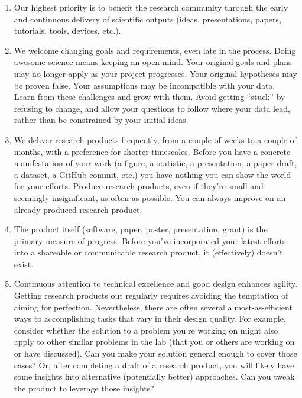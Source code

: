 \documentclass{tufte-book} %
\begin{document}
\begin{enumerate}
\item Our highest priority is to benefit the research community
  through the early and continuous delivery of scientific outputs
  (ideas, presentations, papers, tutorials, tools, devices, etc.).

\item We welcome changing goals and requirements, even late in the process.  Doing
  awesome science means keeping an open mind.  Your original goals and
  plans may no longer apply as your project progresses.  Your original
  hypotheses may be proven false.  Your assumptions may be
  incompatible with your data.  Learn from these challenges and grow
  with them.  Avoid getting ``stuck'' by refusing to change, and allow your questions to follow where your data lead, rather than be constrained by your initial ideas.

\item We deliver research products frequently, from a couple of weeks to
  a couple of months, with a preference for shorter timescales.
  Before you have a concrete manifestation of your work (a figure, a
  statistic, a presentation, a paper draft, a dataset, a GitHub
  commit, etc.) you have nothing you can show the world for your
  efforts.  Produce research products, even if they're small and
  seemingly insignificant, as often as possible.  You can always
  improve on an already produced research product.

  \item The product itself (software, paper, poster,
  presentation, grant) is the primary measure of progress.  Before you've
  incorporated your latest efforts into a shareable or communicable
  research product, it (effectively) doesn't exist.

  \item Continuous attention to technical excellence and good design
  enhances agility.  Getting research products out regularly requires
  avoiding the temptation of aiming for perfection.  Nevertheless,
  there are often several almost-as-efficient ways to accomplishing
  tasks that vary in their design quality.  For example, consider
  whether the solution to a problem you're working on might also apply
  to other similar problems in the lab (that you or others are working
  on or have discussed).  Can you make your solution general enough to
  cover those cases?  Or, after completing a draft of a research
  product, you will likely have some insights into alternative
  (potentially better) approaches.  Can you tweak the product to
  leverage those insights?


\end{enumerate}
\end{document}
